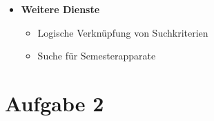 \documentclass[11pt,a4paper,parskip=half ]{scrartcl}
\begin{document}
\begin{itemize}
{		Publikationen}
		\begin{itemize}
			\item \textbf{Beschreibung einer Publikation/einer Reihe mit Schlagwörtern oder als textuelle Zusammenfassung}
			\item[] Es ist nicht erkennbar, ob die Schlagworte automatisch erzeugt werden, aber eine Schlagwortsuche und Schlagworte sind für verschiedene Publikationen vorhanden			\item \textbf{Beantwortung einer konkreten Frage}
			\item[] Nein
			\item \textbf{Zusammenstellung von Argumente für und gegen eine These}
			\item[] Nein
		\end{itemize}
		\item \textbf{Weitere Dienste}
		\begin{itemize}
			\item Logische Verknüpfung von Suchkriterien
			\item Suche für Semesterapparate
		\end{itemize}
	\end{itemize}
	
	\section*{Aufgabe 2}
\end{document}
